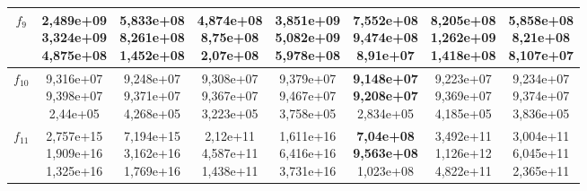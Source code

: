 \begin{table}[t]
\begin{small}
\begin{tabular}{|c|c|c|c|c|c|c|c|}
        $f_9$    & \makecell{2,489e+09 \\ 3,324e+09 \\ 4,875e+08} & \makecell{5,833e+08 \\ 8,261e+08 \\ 1,452e+08} & \makecell{\textbf{4,874e+08} \\ 8,75e+08 \\ 2,07e+08}   & \makecell{3,851e+09 \\ 5,082e+09 \\ 5,978e+08} & \makecell{7,552e+08 \\ 9,474e+08 \\ 8,91e+07}  & \makecell{8,205e+08 \\ 1,262e+09 \\ 1,418e+08} & \makecell{5,858e+08 \\ \textbf{8,21e+08} \\ 8,107e+07} \\\hline
        $f_{10}$ & \makecell{9,316e+07 \\ 9,398e+07 \\ 2,44e+05}  & \makecell{9,248e+07 \\ 9,371e+07 \\ 4,268e+05} & \makecell{9,308e+07 \\ 9,367e+07 \\ 3,223e+05} & \makecell{9,379e+07 \\ 9,467e+07 \\ 3,758e+05} & \makecell{\textbf{9,148e+07} \\ \textbf{9,208e+07} \\ 2,834e+05} & \makecell{9,223e+07 \\ 9,369e+07 \\ 4,185e+05} & \makecell{9,234e+07 \\ 9,374e+07 \\ 3,836e+05} \\\hline
        $f_{11}$ & \makecell{2,757e+15 \\ 1,909e+16 \\ 1,325e+16} & \makecell{7,194e+15 \\ 3,162e+16 \\ 1,769e+16} & \makecell{2,12e+11 \\ 4,587e+11 \\ 1,438e+11}  & \makecell{1,611e+16 \\ 6,416e+16 \\ 3,731e+16} & \makecell{\textbf{7,04e+08} \\ \textbf{9,563e+08} \\ 1,023e+08}  & \makecell{3,492e+11 \\ 1,126e+12 \\ 4,822e+11} & \makecell{3,004e+11 \\ 6,045e+11 \\ 2,365e+11} \\\hline

\end{tabular}
\end{small}
\end{table}
